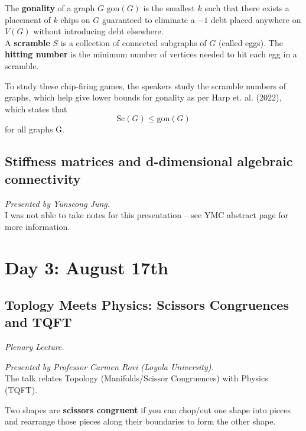 \documentclass[12pt]{amsart}
\begin{document}
\begin{definition}
The \textbf{gonality} of a graph $G$ $\mathrm{gon}(G)$ is the smallest $k$ such that there exists a placement of $k$ chips on $G$ guaranteed to eliminate a $-1$ debt placed anywhere on $V(G)$ without introducing debt elsewhere. \\

A \textbf{scramble} $S$ is a collection of connected subgraphs of $G$ (called eggs). The \textbf{hitting number} is the minimum number of vertices needed to hit each egg in a scramble.
\end{definition}


\begin{result*}
To study these chip-firing games, the speakers study the scramble numbers of graphs, which help give lower bounds for gonality as per Harp et. al. (2022), which states that \[ \mathrm{Sc}(G) \leq \mathrm{gon}(G)\] for all graphs G.
\end{result*}

\vspace{2.5cm}

\subsection{Stiffness matrices and d-dimensional algebraic connectivity}

\textit{}

\vspace{0.25cm}
\textit{Presented by Yunseong Jung.} \\

I was not able to take notes for this presentation -- see YMC abstract page for more information.

\newpage

\section{Day 3: August 17th}

\subsection{Toplogy Meets Physics: Scissors Congruences and TQFT}

\textit{Plenary Lecture.}
\vspace{0.25cm}

\textit{Presented by Professor Carmen Rovi (Loyola University).} \\

The talk relates Topology (Manifolds/Scissor Congruences) with Physics (TQFT). \\

\begin{definition}
Two shapes are \textbf{scissors congruent} if you can chop/cut one shape into pieces and rearrange those pieces along their boundaries to form the other shape.
\end{definition}
\end{document}

